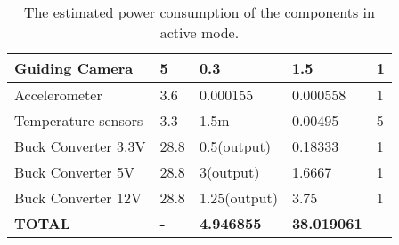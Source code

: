 \begin{center}
\begin{table}[H]
\begin{tabular}{|m{}|m{}|m{}|m{}|m{}|}
Guiding Camera          & 5                               & 0.3                                 & 1.5                          & 1                 \\ \hline
Accelerometer           & 3.6                             & 0.000155                            & 0.000558                     & 1                 \\ \hline
Temperature sensors     & 3.3                             & 1.5m                                & 0.00495                      & 5                 \\ \hline
Buck Converter 3.3V     & 28.8                            & 0.5(output)                         & 0.18333                      & 1                 \\ \hline
Buck Converter 5V       & 28.8                            & 3(output)                           & 1.6667                       & 1                 \\ \hline
Buck Converter 12V      & 28.8                            & 1.25(output)                        & 3.75                         & 1                 \\ \hline
\textbf{TOTAL}          & \textbf{-}                      & \textbf{4.946855}                   & \textbf{38.019061}           &                   \\ \hline
\end{tabular}
\caption{The estimated power consumption of the components in active mode.}
\end{table}
\label{tab: power consumption}
\end{center}




\raggedbottom